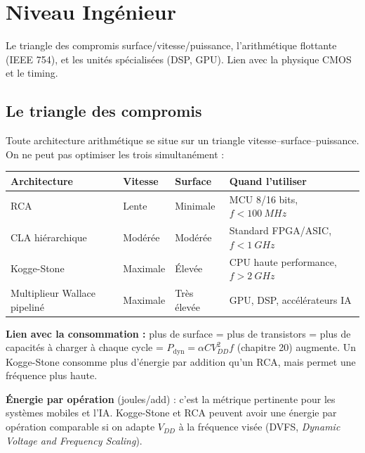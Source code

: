 \documentclass[12pt,a4paper,twoside]{book}
\begin{document}
\section{Niveau Ingénieur}

\begin{ingenieur}
Le triangle des compromis surface/vitesse/puissance, l'arithmétique flottante (IEEE 754), et les unités spécialisées (DSP, GPU). Lien avec la physique CMOS et le timing.
\end{ingenieur}

\subsection{Le triangle des compromis}

\begin{formule}
Toute architecture arithmétique se situe sur un triangle vitesse--surface--puissance. On ne peut pas optimiser les trois simultanément :

\begin{center}
\renewcommand{\arraystretch}{1.4}
\begin{tabular}{p{3cm}p{2.5cm}p{2.5cm}p{4cm}}
\toprule
\textbf{Architecture} & \textbf{Vitesse} & \textbf{Surface} & \textbf{Quand l'utiliser} \\
\midrule
RCA & Lente & Minimale & MCU 8/16 bits, $f < \SI{100}{MHz}$ \\
CLA hiérarchique & Modérée & Modérée & Standard FPGA/ASIC, $f < \SI{1}{GHz}$ \\
Kogge-Stone & Maximale & Élevée & CPU haute performance, $f > \SI{2}{GHz}$ \\
Multiplieur Wallace pipeliné & Maximale & Très élevée & GPU, DSP, accélérateurs IA \\
\bottomrule
\end{tabular}
\end{center}
\end{formule}

\begin{intuition}
\textbf{Lien avec la consommation :} plus de surface = plus de transistors = plus de capacités à charger à chaque cycle = $P_{\text{dyn}} = \alpha C V_{DD}^2 f$ (chapitre 20) augmente. Un Kogge-Stone consomme plus d'énergie par addition qu'un RCA, mais permet une fréquence plus haute.

\textbf{Énergie par opération} (joules/add) : c'est la métrique pertinente pour les systèmes mobiles et l'IA. Kogge-Stone et RCA peuvent avoir une énergie par opération comparable si on adapte $V_{DD}$ à la fréquence visée (DVFS, \textit{Dynamic Voltage and Frequency Scaling}).
\end{intuition}
\end{document}
